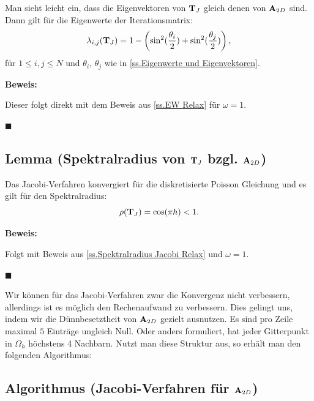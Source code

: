 Man sieht leicht ein, dass die Eigenvektoren von ${\textbf{T}}_{J}$ gleich denen von ${\textbf{A}}_{2D}$ sind. Dann gilt für die Eigenwerte der Iterationsmatrix:
\begin{equation}
\lambda_{i,j}({\textbf{T}}_{J}) = 1 - \left(\sin^{2}(\frac {\theta_{i}} {2}) + \sin^{2}(\frac {\theta_{j}} {2}) \right), \label{eq.Jacobi-Eigenwerte}
\end{equation}
für $1 \le i,j \le N$ und $\theta_{i}$, $\theta_{j}$ wie in \autoref{ss.Eigenwerte und Eigenvektoren}.

\textbf{Beweis:}\label{b.EW Jacobi}

Dieser folgt direkt mit dem Beweis aus \autoref{ss.EW Relax} für $\omega = 1$.
\begin{flushright}
$\blacksquare$
\end{flushright}

\subsection{Lemma (Spektralradius von ${\textbf{T}}_{J}$ bzgl. ${\textbf{A}}_{2D}$)}\label{ss.Spektralradius Jacobi}

Das Jacobi-Verfahren konvergiert für die diskretisierte Poisson Gleichung und es gilt für den Spektralradius:
\begin{equation}
\rho({\textbf{T}}_{J}) = \cos(\pi h) < 1.
\end{equation}

\textbf{Beweis:}\label{b.Spektral Jacobi}

Folgt mit Beweis aus \autoref{ss.Spektralradius Jacobi Relax} und $\omega = 1$.
\begin{flushright}
$\blacksquare$
\end{flushright}

Wir können für das Jacobi-Verfahren zwar die Konvergenz nicht verbessern, allerdings ist es möglich den Rechenaufwand zu verbessern. Dies gelingt uns, indem wir die Dünnbesetztheit von ${\textbf{A}}_{2D}$ gezielt ausnutzen. Es sind pro Zeile maximal $5$ Einträge ungleich Null. Oder anders formuliert, hat jeder Gitterpunkt in $\Omega_{h}$ höchstens 4 Nachbarn. Nutzt man diese Struktur aus, so erhält man den folgenden Algorithmus:

\subsection{Algorithmus (Jacobi-Verfahren für ${\textbf{A}}_{2D}$)}\label{ss.Jacobi für Poisson}


